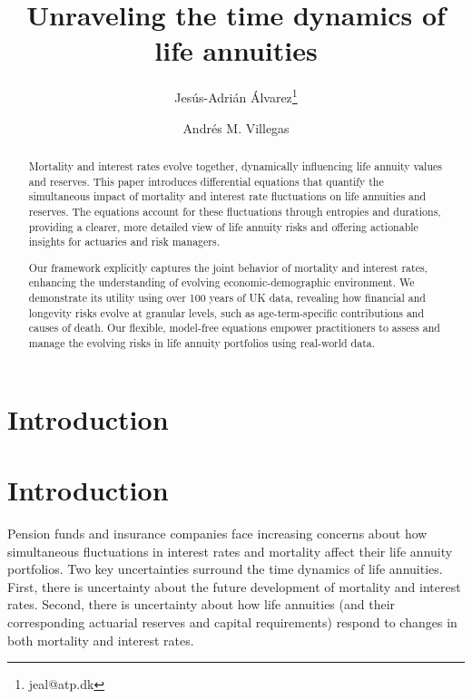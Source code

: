 \documentclass[12pt]{article}
\title{Unraveling the time dynamics of life annuities}
\author[1]{Jes\'us-Adri\'an \'Alvarez\thanks{jeal@atp.dk}}
\author[2]{Andr\'es M. Villegas}
\affil[1]{{\small No affiliation} }
\affil[2]{\small{School of Risk and Actuarial Studies and ARC Centre of Excellence in Population Ageing Research (CEPAR)\\ UNSW Business School, Sydney, Australia}}
\begin{document}
\maketitle

{
\setcounter{tocdepth}{2}
}



\begin{abstract}
	
Mortality and interest rates evolve together, dynamically influencing life annuity values and reserves. This paper introduces differential equations that quantify the simultaneous impact of mortality and interest rate fluctuations on life annuities and reserves. The equations account for these fluctuations through entropies and durations, providing a clearer, more detailed view of life annuity risks and offering actionable insights for actuaries and risk managers.

Our framework explicitly captures the joint behavior of mortality and interest rates, enhancing the understanding of evolving economic-demographic environment. We demonstrate its utility using over 100 years of UK data, revealing how financial and longevity risks evolve at granular levels, such as age-term-specific contributions and causes of death. Our flexible, model-free equations empower practitioners to assess and manage the evolving risks in life annuity portfolios using real-world data.	
	
	
\end{abstract}
\newpage
\section{Introduction}\label{sec:1_introduction}
\section{Introduction}

Pension funds and insurance companies face increasing concerns about how simultaneous fluctuations in interest rates and mortality affect their life annuity portfolios. Two key uncertainties surround the time dynamics of life annuities. First, there is uncertainty about the future development of mortality and interest rates. Second, there is uncertainty about how life annuities (and their corresponding actuarial reserves and capital requirements) respond to changes in both mortality and interest rates. 
\end{document}

